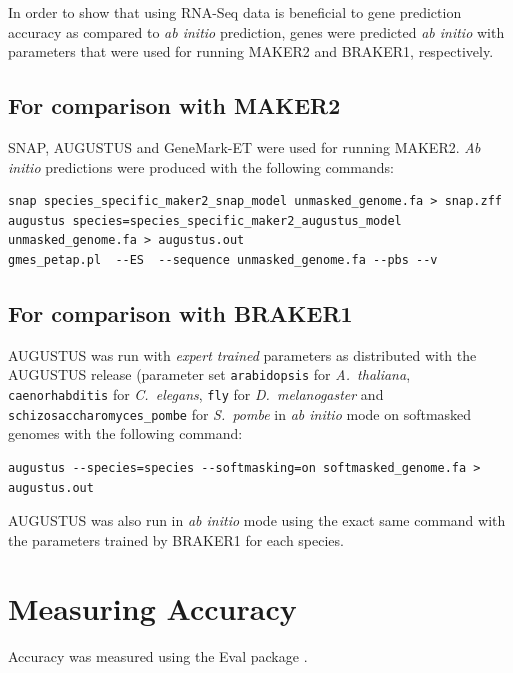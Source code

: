 \documentclass[a4paper,10pt]{report}
\begin{document}
In order to show that using RNA-Seq data is beneficial to gene prediction accuracy as compared to \textit{ab initio} prediction, genes were predicted \textit{ab initio} with parameters that were used for running MAKER2 and BRAKER1, respectively.

\subsection{For comparison with MAKER2}

SNAP, AUGUSTUS and GeneMark-ET were used for running MAKER2. \textit{Ab initio} predictions were produced with the following commands:

\begin{verbatim}
snap species_specific_maker2_snap_model unmasked_genome.fa > snap.zff
augustus species=species_specific_maker2_augustus_model unmasked_genome.fa > augustus.out
gmes_petap.pl  --ES  --sequence unmasked_genome.fa --pbs --v
\end{verbatim}

\subsection{For comparison with BRAKER1}

AUGUSTUS was run with \textit{expert trained} parameters as distributed with the AUGUSTUS release (parameter set \texttt{arabidopsis} for \textit{A.~thaliana}, \texttt{caenorhabditis} for \textit{C.~elegans}, \texttt{fly} for \textit{D.~melanogaster} and \texttt{schizosaccharomyces\_pombe} for \textit{S.~pombe} in \textit{ab initio} mode on softmasked genomes with the following command:

\begin{verbatim}
augustus --species=species --softmasking=on softmasked_genome.fa > augustus.out 
\end{verbatim}

\noindent AUGUSTUS was also run in \textit{ab initio} mode using the exact same command with the parameters trained by BRAKER1 for each species.


\section{Measuring Accuracy}

Accuracy was measured using the Eval package \cite{Eval}.
\end{document}
